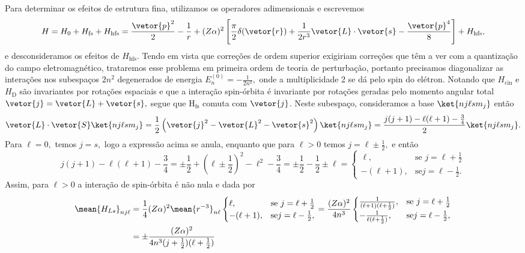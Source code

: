 Para determinar os efeitos de estrutura fina, utilizamos os operadores adimensionais e escrevemos
\begin{equation*}
   H = H_0 + H_{\mathrm{fs}} + H_\mathrm{hfs} = \frac{\vetor{p}^2}{2} - \frac{1}{r} + (Z \alpha)^2\left[\frac{\pi}{2} \delta(\vetor{r}) + \frac1{2 r^3} \vetor{L} \cdot \vetor{s} - \frac{\vetor{p}^4}{8}\right] + H_\mathrm{hfs},
\end{equation*}
e desconsideramos os efeitos de \(H_\mathrm{hfs}.\) Tendo em vista que correções de ordem superior exigiriam correções que têm a ver com a quantização do campo eletromagnético, trataremos esse problema em primeira ordem de teoria de perturbação, portanto precisamos diagonalizar as interações nos subespaços \(2n^2\) degenerados de energia \(E_n^{(0)} = -\frac{1}{2n^2},\) onde a multiplicidade 2 se dá pelo spin do elétron. Notando que \(H_\mathrm{cin}\) e \(H_\mathrm{D}\) são invariantes por rotações espaciais e que a interação spin-órbita é invariante por rotações geradas pelo momento angular total \(\vetor{j} = \vetor{L} + \vetor{s},\) segue que \(\mathrm{H}_{\mathrm{fs}}\) comuta com \(\vetor{j}\). Neste subespaço, consideramos a base \(\ket{n j \ell s m_j}\) então
\begin{equation*}
   \vetor{L}\cdot \vetor{S} \ket{n j \ell s m_j} = \frac12 \left(\vetor{j}^2 - \vetor{L}^2 - \vetor{s}^2\right)\ket{n j \ell s m_j} %
   = \frac{j(j+1) - \ell (\ell + 1) - \frac34}{2}\ket{nj\ell s m_j}.
\end{equation*}
Para \(\ell = 0,\) temos \(j = s,\) logo a expressão acima se anula, enquanto que para \(\ell > 0\) temos \(j = \ell \pm \frac12,\) e então
\begin{equation*}
    j(j + 1) - \ell (\ell + 1) - \frac34 = \pm \frac12  + \left(\ell \pm \frac12\right)^2 - \ell^2 - \frac34 = \pm \frac12 - \frac12 \pm \ell = \begin{cases}
       \ell,&\text{se }j = \ell + \frac12\\
       - (\ell + 1),&\text{se} j = \ell - \frac12.
    \end{cases}
\end{equation*}
Assim, para \(\ell > 0\) a interação de spin-órbita é não nula e dada por
\begin{align*}
   \mean{H_{Ls}}_{nj \ell} &= \frac14 (Z \alpha)^2 \mean{r^{-3}}_{n\ell}
   \begin{cases}
      \ell,&\text{se }j = \ell + \frac12\\
      - (\ell + 1),&\text{se} j = \ell - \frac12,
   \end{cases} 
   = \frac{(Z \alpha)^2}{4n^3} 
   \begin{cases}
      \frac{1}{(\ell + 1)(\ell + \frac12)},&\text{se }j = \ell + \frac12\\
      - \frac{1}{\ell (\ell + \frac12)},&\text{se} j = \ell - \frac12,
   \end{cases}\\
                           &= \pm\frac{(Z \alpha)^2}{4n^3 (j + \frac12)(\ell + \frac12)}
\end{align*}
